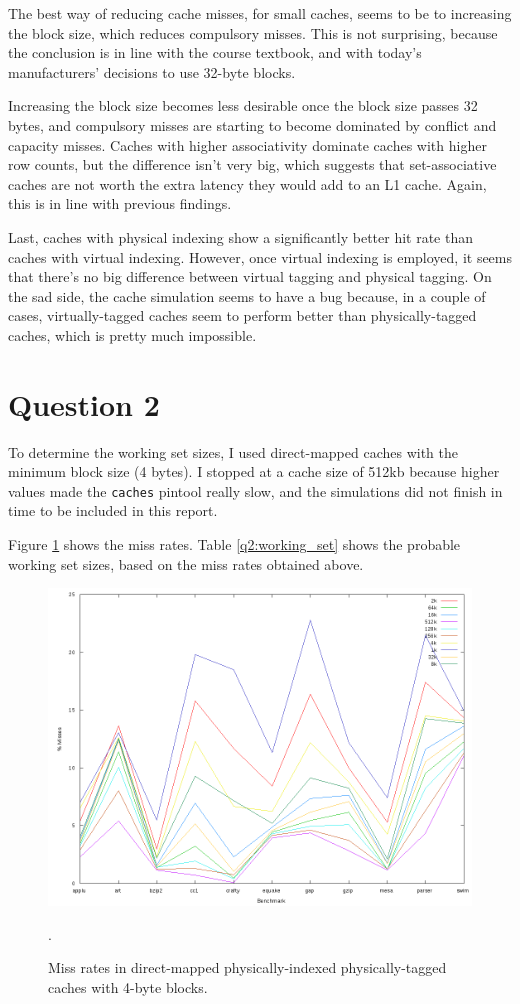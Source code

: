The best way of reducing cache misses, for small caches, seems to be to
increasing the block size, which reduces compulsory misses. This is not
surprising, because the conclusion is in line with the course textbook, and
with today's manufacturers' decisions to use 32-byte blocks.

Increasing the block size becomes less desirable once the block size passes 32
bytes, and compulsory misses are starting to become dominated by conflict and
capacity misses. Caches with higher associativity dominate caches with higher
row counts, but the difference isn't very big, which suggests that
set-associative caches are not worth the extra latency they would add to an L1
cache. Again, this is in line with previous findings.

Last, caches with physical indexing show a significantly better hit rate than
caches with virtual indexing. However, once virtual indexing is employed, it
seems that there's no big difference between virtual tagging and physical
tagging. On the sad side, the cache simulation seems to have a bug because, in a
couple of cases, virtually-tagged caches seem to perform better than
physically-tagged caches, which is pretty much impossible.

\section{Question 2}
To determine the working set sizes, I used direct-mapped caches with the
minimum block size (4 bytes). I stopped at a cache size of 512kb because 
higher values made the \texttt{caches} pintool really slow, and the simulations
did not finish in time to be included in this report.

Figure \ref{q2:miss_rates} shows the miss rates. Table \ref{q2:working_set}
shows the probable working set sizes, based on the miss rates obtained above.

\begin{figure}[htb]
  \includegraphics[width=6.8in]{6.823/lab2/figs/working_set.png}
  \caption{Miss rates in direct-mapped physically-indexed physically-tagged
  caches with 4-byte blocks. }
  \label{q2:miss_rates}.
\end{figure}

